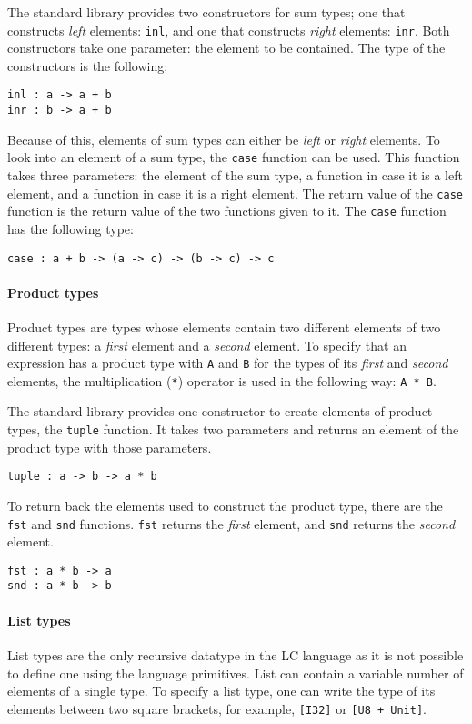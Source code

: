 \documentclass[12pt]{article}
\begin{document}
The standard library provides two constructors for sum types; one that
constructs \emph{left} elements: \verb$inl$, and one that constructs
\emph{right} elements: \verb$inr$. Both constructors take one parameter: the
element to be contained. The type of the constructors is the following:
\begin{lstlisting}
inl : a -> a + b
inr : b -> a + b
\end{lstlisting}
Because of this, elements of sum types can either be \emph{left} or \emph{right}
elements. To look into an element of a sum type, the \verb$case$ function can be
used. This function takes three parameters: the element of the sum type, a
function in case it is a left element, and a function in case it is a right
element. The return value of the \verb$case$ function is the return value of the
two functions given to it. The \verb$case$ function has the following type:
\begin{lstlisting}
case : a + b -> (a -> c) -> (b -> c) -> c
\end{lstlisting}

\paragraph{Product types} Product types are types whose elements contain two
different elements of two different types: a \emph{first} element and a
\emph{second} element. To specify that an expression has a product type with
\verb$A$ and \verb$B$ for the types of its \emph{first} and \emph{second}
elements, the multiplication (\verb$*$) operator is used in the following way:
\verb$A * B$.

The standard library provides one constructor to create elements of product
types, the \verb$tuple$ function. It takes two parameters and returns an element
of the product type with those parameters.
\begin{lstlisting}
tuple : a -> b -> a * b
\end{lstlisting}
To return back the elements used to construct the product type, there are the
\verb$fst$ and \verb$snd$ functions. \verb$fst$ returns the \emph{first}
element, and \verb$snd$ returns the \emph{second} element.
\begin{lstlisting}
fst : a * b -> a
snd : a * b -> b
\end{lstlisting}

\paragraph{List types} List types are the only recursive datatype in the LC
language as it is not possible to define one using the language primitives. List
can contain a variable number of elements of a single type. To specify a list
type, one can write the type of its elements between two square brackets, for
example, \verb$[I32]$ or \verb$[U8 + Unit]$.
\end{document}
